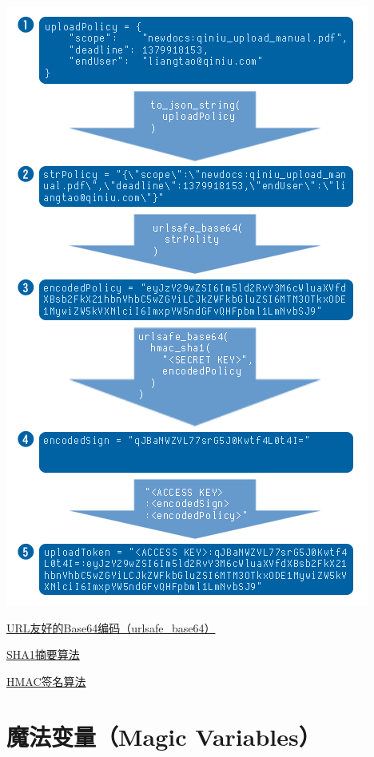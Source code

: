 \documentclass[11pt, oneside]{book}
\begin{document}
\begin{center}
\includegraphics[scale=1]{../pics/upload/upload_token.png}
\end{center}

\href{http://zh.wikipedia.org/wiki/Base64#.E5.9C.A8URL.E4.B8.AD.E7.9A.84.E5.BA.94.E7.94.A8}{URL友好的Base64编码（urlsafe\_base64）}\par
\href{http://en.wikipedia.org/wiki/SHA-1}{SHA1摘要算法}\par
\href{http://en.wikipedia.org/wiki/Hash-based_message_authentication_code}{HMAC签名算法}\par

\section{魔法变量（Magic Variables）}
\end{document}

